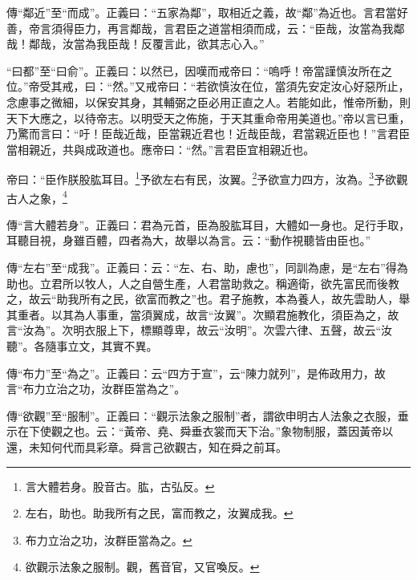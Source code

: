 {\noindent\zhuan{}\fzbyks 傳“鄰近”至“而成”。正義曰：“五家為鄰”，取相近之義，故“鄰”為近也。言君當好善，帝言須得臣力，再言鄰哉，言君臣之道當相須而成，云：“臣哉，汝當為我鄰哉！鄰哉，汝當為我臣哉！反覆言此，欲其志心入。” \par}

{\noindent\shu{}\fzkt “曰都”至“曰俞”。正義曰：以然已，因嘆而戒帝曰：“嗚呼！帝當謹慎汝所在之位。”帝受其戒，曰：“然。”又戒帝曰：“若欲慎汝在位，當須先安定汝心好惡所止，念慮事之微細，以保安其身，其輔弼之臣必用正直之人。若能如此，惟帝所動，則天下大應之，以待帝志。以明受天之佈施，于天其重命帝用美道也。”帝以言已重，乃驚而言曰：“吁！臣哉近哉，臣當親近君也！近哉臣哉，君當親近臣也！”言君臣當相親近，共與成政道也。應帝曰：“然。”言君臣宜相親近也。 \par}

帝曰：“臣作朕股肱耳目。\footnote{言大體若身。股音古。肱，古弘反。}予欲左右有民，汝翼。\footnote{左右，助也。助我所有之民，富而教之，汝翼成我。}予欲宣力四方，汝為。\footnote{布力立治之功，汝群臣當為之。}予欲觀古人之象，\footnote{欲觀示法象之服制。觀，舊音官，又官喚反。}


{\noindent\zhuan{}\fzbyks 傳“言大體若身”。正義曰：君為元首，臣為股肱耳目，大體如一身也。足行手取，耳聽目視，身雖百體，四者為大，故舉以為言。云：“動作視聽皆由臣也。” \par}

{\noindent\zhuan{}\fzbyks 傳“左右”至“成我”。正義曰：云：“左、右、助，慮也”，同訓為慮，是“左右”得為助也。立君所以牧人，人之自營生產，人君當助救之。稱適衛，欲先富民而後教之，故云“助我所有之民，欲富而教之”也。君子施教，本為養人，故先雲助人，舉其重者。以其為人事重，當須翼成，故言“汝翼”。次顯君施教化，須臣為之，故言“汝為”。次明衣服上下，標顯尊卑，故云“汝明”。次雲六律、五聲，故云“汝聽”。各隨事立文，其實不異。 \par}

{\noindent\zhuan{}\fzbyks 傳“布力”至“為之”。正義曰：云“四方于宣”，云“陳力就列”，是佈政用力，故言“布力立治之功，汝群臣當為之”。 \par}

{\noindent\zhuan{}\fzbyks 傳“欲觀”至“服制”。正義曰：“觀示法象之服制”者，謂欲申明古人法象之衣服，垂示在下使觀之也。云：“黃帝、堯、舜垂衣裳而天下治。”象物制服，蓋因黃帝以還，未知何代而具彩章。舜言己欲觀古，知在舜之前耳。 \par}

